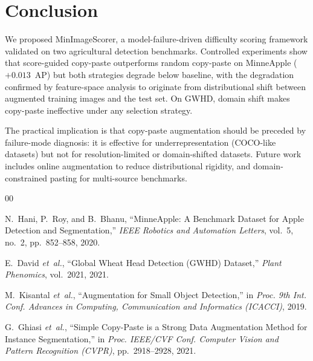 \documentclass[conference]{IEEEtran}
\begin{document}
\section{Conclusion}

We proposed MinImageScorer, a model-failure-driven difficulty scoring
framework validated on two agricultural detection benchmarks.
Controlled experiments show that score-guided copy-paste outperforms
random copy-paste on MinneApple ($+0.013$~AP) but both strategies
degrade below baseline, with the degradation confirmed by
feature-space analysis to originate from distributional shift
between augmented training images and the test set.
On GWHD, domain shift makes copy-paste ineffective under any
selection strategy.

The practical implication is that copy-paste augmentation should be
preceded by failure-mode diagnosis: it is effective for
underrepresentation (COCO-like datasets) but not for
resolution-limited or domain-shifted datasets. Future work includes
online augmentation to reduce distributional rigidity, and
domain-constrained pasting for multi-source benchmarks.

\begin{thebibliography}{00}

N.~Hani, P.~Roy, and B.~Bhanu,
``MinneApple: A Benchmark Dataset for Apple Detection and
Segmentation,''
\textit{IEEE Robotics and Automation Letters},
vol.~5, no.~2, pp.~852--858, 2020.

E.~David \textit{et~al.},
``Global Wheat Head Detection (GWHD) Dataset,''
\textit{Plant Phenomics}, vol.~2021, 2021.

M.~Kisantal \textit{et~al.},
``Augmentation for Small Object Detection,''
in \textit{Proc. 9th Int. Conf. Advances in Computing,
Communication and Informatics (ICACCI)}, 2019.

G.~Ghiasi \textit{et~al.},
``Simple Copy-Paste is a Strong Data Augmentation Method
for Instance Segmentation,''
in \textit{Proc. IEEE/CVF Conf. Computer Vision and Pattern
Recognition (CVPR)}, pp.~2918--2928, 2021.


\end{thebibliography}
\end{document}

